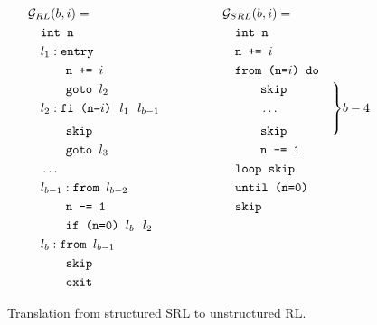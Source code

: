 \documentclass[12pt,oneside,openright,pdftex,a4paper]{report}
\begin{document}
\begin{figure}
  \centering
  $$\begin{aligned}
    & \mathcal{G}_{RL}(b,i) =                             & \qquad \qquad & \mathcal{G}_{SRL}(b,i) =          \\
    & \quad \texttt{int n}                                & \qquad \qquad & \quad \texttt{int n}              \\
    & \quad l_1: \texttt{entry}                           & \qquad \qquad & \quad \texttt{n += $i$}           \\
    & \quad \ \ \ \ \ \ \texttt{n += } i                  & \qquad \qquad & \quad \texttt{from (n=$i$) do}    \\
    & \quad \ \ \ \ \ \ \texttt{goto }l_2                 & \qquad \qquad & \quad \ \ \ \ \ \ \texttt{skip}   \\
    & \quad l_2: \texttt{fi (n=$i$)} \ \ l_1 \ \ l_{b-1}  & \qquad \qquad & \quad \ \ \ \ \ \ \dots
    \qquad \qquad \smash{\left.\begin{array}{@{}c@{}}\\[\jot]\\[\jot]\\[\jot]\end{array}\right\}} b-4 \\[\jot]
    & \quad \ \ \ \ \ \ \texttt{skip}                     & \qquad \qquad & \quad \ \ \ \ \ \ \texttt{skip}   \\
    & \quad \ \ \ \ \ \ \texttt{goto }l_3                 & \qquad \qquad & \quad \ \ \ \ \ \ \texttt{n -= 1} \\
    & \quad \dots                                         & \qquad \qquad & \quad \texttt{loop skip}          \\
    & \quad l_{b-1}: \texttt{from } l_{b-2}               & \qquad \qquad & \quad \texttt{until (n=0)}        \\
    & \quad \ \ \ \ \ \ \texttt{n -= 1}                   & \qquad \qquad & \quad \texttt{skip}               \\
    & \quad \ \ \ \ \ \ \texttt{if (n=0) }l_b \ \ l_2                                                         \\
    & \quad l_b: \texttt{from } l_{b-1}                                                                       \\
    & \quad \ \ \ \ \ \ \texttt{skip}                                                                         \\
    & \quad \ \ \ \ \ \ \texttt{exit}
  \end{aligned}$$
  \caption{Translation from structured SRL to unstructured RL.}
\end{figure}
\end{document}
